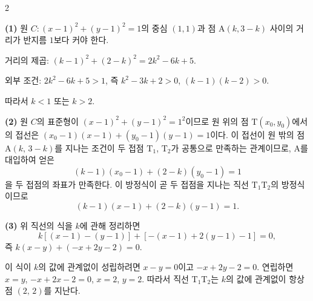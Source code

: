 \documentclass[10pt,fleqn]{article}
\renewcommand{\solpart}[1]{%
  \par\addvspace{10pt}\noindent
  {\sffamily\bfseries\color{black}(#1)}\hspace{3mm}\ignorespaces%
}
\begin{document}
\begin{multicols}{2}
\raggedcolumns


\solpart{1} 원 $C: (x-1)^{2}+(y-1)^{2}=1$의 중심 $(1,1)$과 점 $\mathrm{A}(k, 3-k)$ 사이의 거리가 반지름 $1$보다 커야 한다.

거리의 제곱: $(k-1)^{2} + (2-k)^{2} = 2k^{2} - 6k + 5$.

외부 조건: $2k^{2} - 6k + 5 > 1$, 즉 $k^{2} - 3k + 2 > 0$, $(k-1)(k-2)>0$.

따라서 $k<1$ 또는 $k>2$.

\solpart{2} 원 $C$의 표준형이 $(x-1)^{2}+(y-1)^{2}=1^{2}$이므로 원 위의 점 $\mathrm{T}(x_{0},y_{0})$에서의 접선은 $(x_{0}-1)(x-1)+(y_{0}-1)(y-1)=1$이다. 이 접선이 원 밖의 점 $\mathrm{A}(k,\,3-k)$를 지나는 조건이 두 접점 $\mathrm{T}_1$, $\mathrm{T}_2$가 공통으로 만족하는 관계이므로, $\mathrm{A}$를 대입하여 얻은
\[ (k-1)(x_{0}-1) + (2-k)(y_{0}-1) = 1 \]
을 두 접점의 좌표가 만족한다. 이 방정식이 곧 두 접점을 지나는 직선 $\mathrm{T}_1\mathrm{T}_2$의 방정식이므로
\[ (k-1)(x-1) + (2-k)(y-1) = 1. \]

\solpart{3} 위 직선의 식을 $k$에 관해 정리하면
\[ k[(x-1)-(y-1)] + [-(x-1)+2(y-1)-1] = 0, \]
즉 $k(x-y) + (-x+2y-2) = 0$.

이 식이 $k$의 값에 관계없이 성립하려면 $x-y=0$이고 $-x+2y-2=0$. 연립하면 $x=y$, $-x+2x-2=0$, $x=2$, $y=2$. 따라서 직선 $\mathrm{T}_1\mathrm{T}_2$는 $k$의 값에 관계없이 항상 점 $(2,\,2)$를 지난다.




\end{multicols}
\end{document}
